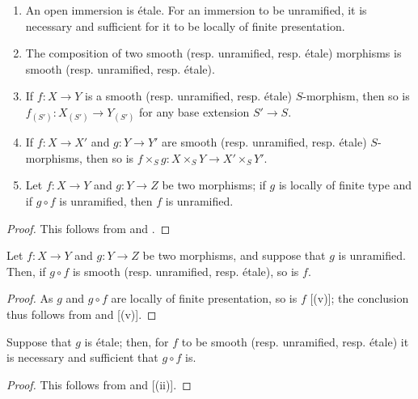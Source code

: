 \begin{proposition}[17.3.3]
\label{IV.17.3.3}
\medskip\noindent
\begin{enumerate}
  \item[{\rm(i)}] An open immersion is \'etale.
    For an immersion to be unramified, it is necessary and sufficient for it to be locally of finite presentation.
  \item[{\rm(ii)}] The composition of two smooth (resp. unramified, resp. \'etale) morphisms is smooth (resp. unramified, resp. \'etale).
  \item[{\rm(iii)}] If $f:X\to Y$ is a smooth (resp. unramified, resp. \'etale) $S$-morphism, then so is $f_{(S')}:X_{(S')}\to Y_{(S')}$ for any base extension $S'\to S$. 
  \item[{\rm(iv)}] If $f:X\to X'$ and $g:Y\to Y'$ are smooth (resp. unramified, resp. \'etale) $S$-morphisms, then so is $f\times_S g:X\times_S Y\to X'\times_S Y'$.
  \item[{\rm(v)}] Let $f:X\to Y$ and $g:Y\to Z$ be two morphisms;
    if $g$ is locally of finite type and if $g\circ f$ is unramified, then $f$ is unramified.
\end{enumerate}
\end{proposition}

\begin{proof}
This follows from  and .
\end{proof}

\begin{proposition}[17.3.4]
\label{IV.17.3.4}
Let $f:X\to Y$ and $g:Y\to Z$ be two morphisms, and suppose that $g$ is unramified.
Then, if $g\circ f$ is smooth (resp. unramified, resp. \'etale), so is $f$.
\end{proposition}

\begin{proof}
As $g$ and $g\circ f$ are locally of finite presentation, so is $f$ [(v)];
the conclusion thus follows from  and [(v)].
\end{proof}

\begin{corollary}[17.3.5]
\label{IV.17.3.5}
Suppose that $g$ is \'etale;
then, for $f$ to be smooth (resp. unramified, resp. \'etale) it is necessary and sufficient that $g\circ f$ is.
\end{corollary}

\begin{proof}
This follows from  and [(ii)].
\end{proof}

